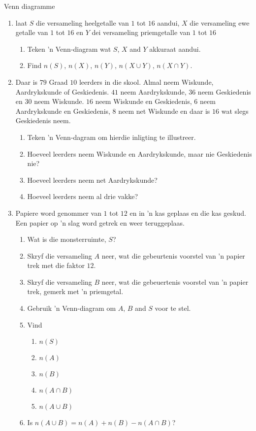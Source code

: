 \begin{exercises}{Venn diagramme}
  \begin{enumerate}[itemsep=5pt, label=\textbf{\arabic*}.]
  \item  laat $S$ die versameling heelgetalle van $1$ tot $16$ aandui, $X$
    die versameling ewe getalle van $1$ tot $16$ en $Y$ dei versameling priemgetalle van $1$ tot $16$
    \begin{enumerate}
    \item Teken 'n Venn-diagram wat $S$, $X$ and $Y$ akkuraat aandui.
    \item Find $n\left(S\right)$, $n\left(X\right)$, $n\left(Y\right)$,
      $n\left(X\cup Y\right)$, $n\left(X\cap Y\right)$.
    \end{enumerate}
  \item Daar is $79$ Graad $10$ leerders in die skool. Almal neem Wiskunde, Aardrykskunde of Geskiedenis. $41$ neem Aardrykskunde, $36$ neem Geskiedenis en $30$ neem Wiskunde. $16$ neem Wiskunde en Geskiedenis, $6$ neem Aardrykskunde en Geskiedenis, $8$ neem net Wiskunde en daar is $16$ wat slegs Geskiedenis neem.
    \begin{enumerate}
    \item Teken 'n Venn-dagram om hierdie inligting te illustreer.
    \item Hoeveel leerders neem Wiskunde en Aardrykskunde, maar nie Geskiedenis nie?
    \item Hoeveel leerders neem net Aardrykskunde?
    \item Hoeveel leerders neem al drie vakke?
    \end{enumerate}
  \item Papiere word genommer van $1$ tot $12$ en in 'n kas geplaas en die kas geskud. Een papier op 'n slag word getrek en weer teruggeplaas.
    \begin{enumerate}
    \item Wat is die monsterruimte, $S$?
    \item Skryf die versameling $A$ neer, wat die gebeurtenis voorstel van 'n papier trek met die faktor $12$.
    \item Skryf die versameling $B$ neer, wat die gebeuertenis voorstel van 'n papier trek, gemerk met 'n priemgetal.
    \item Gebruik 'n Venn-diagram om $A$, $B$ and $S$ voor te stel.
    \item Vind
      \begin{enumerate}
      \item $n\left(S\right)$
      \item $n\left(A\right)$
      \item $n\left(B\right)$
      \item $n\left(A\cap B\right)$
      \item $n\left(A\cup B\right)$
      \end{enumerate}
    \item Is $n\left(A\cup B\right)=n\left(A\right)+n\left(B\right)-n\left(A\cap B\right)$?
    \end{enumerate}
  \end{enumerate}


\end{exercises}

